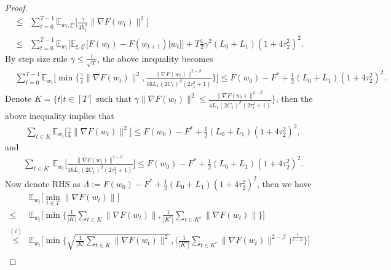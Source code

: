 \documentclass[10pt]{article} %
\newtheorem{proof}{Proof}
\begin{document}
\begin{proof}
\begin{align}
        \leq& \sum_{t=0}^{T-1}\mathbb{E}_{w_t,\xi'}\Big[ \frac{\gamma}{4h_t^{\beta}} \big \|\nabla F(w_t) \big \|^2 \Big] \nonumber \\
        \leq& \sum_{t=0}^{T-1}\mathbb{E}_{w_t}\Big[\mathbb{E}_{\xi,\xi'}\big[F(w_t) - F(w_{t+1})|w_t \big]\Big]\nonumber+T\frac{1}{2}\gamma^2(L_0+L_1)(1+4\tau_2^2)^2.
\end{align}
By step size rule $\gamma \leq \frac{1}{\sqrt{T}}$, the above inequality becomes
\begin{align}
    &\sum_{t=0}^{T-1}\mathbb{E}_{w_t}\Big[\min \Big \{ \frac{\gamma}{4} \big \|\nabla F(w_t) \big \|^2, \frac{\big \|\nabla F(w_t) \big \|^{2-\beta}}{16L_1(2C_1)^{\beta}(2\tau_1^2+1)}\Big \}\Big]\nonumber  \leq  F(w_0)-F^*+\frac{1}{2}(L_0+L_1)(1+4{\tau_2^2})^2.
\end{align}
Denote $K=\{t |t\in [T] \text{ such that } \gamma \big \|\nabla F(w_t) \big \|^2 \leq \frac{\|\nabla F(w_t) \|^{2-\beta}}{4L_1(2C_1)^{\beta}(2\tau_1^2+1)} \}$, then the above inequality implies that
\begin{align}
    &\sum_{t\in K} \mathbb{E}_{w_t}\Big[\frac{\gamma}{4}\big \|\nabla F(w_t) \big \|^2 \Big]  \leq F(w_0) - F^* + \frac{1}{2}(L_0+L_1)(1+4\tau_2^2)^2,\label{K's summation}
\end{align}
and
\begin{align}
    &\sum_{t\in K^c}\mathbb{E}_{w_t}\Big[ \frac{\big \|\nabla F(w_t) \big \|^{2-\beta}}{16L_1(2C_1)^{\beta}(2\tau_1^2+1)}\Big] \leq F(w_0) - F^* + \frac{1}{2}(L_0+L_1)(1+4\tau_2^2)^2. \label{Kc's summation}
\end{align}
Now denote RHS as $\Lambda := F(w_0)-F^* + \frac{1}{2}(L_0+L_1)(1+4\tau_2^2)^2$, then we have
\begin{align}
    &\mathbb{E}_{w_t}\Big[\min_{t\in T} \big \|\nabla F(w_t) \big \| \Big]\nonumber\\
    \leq& \mathbb{E}_{w_t}\Big[\min \Big \{\frac{1}{|K|} \sum_{t\in K} \big \|\nabla F(w_t) \big \|, \frac{1}{|K^c|}\sum_{t \in K^c}\big \| \nabla F(w_t) \big \| \Big \}\Big] \nonumber\\
    \overset{(i)}{\leq}& \mathbb{E}_{w_t}\Big[ \min \Big \{\sqrt{\frac{1}{|K|} \sum_{t\in K}^{} \big \|\nabla F(w_t) \big \|^2 }, \Big(\frac{1}{|K^c|}\sum_{t\in K^c}^{}\big \| \nabla F(w_t) \big \|^{2-\beta} \Big)^{\frac{1}{2-\beta}}\Big\}\Big] \nonumber\\

\end{align}
\end{proof}
\end{document}
